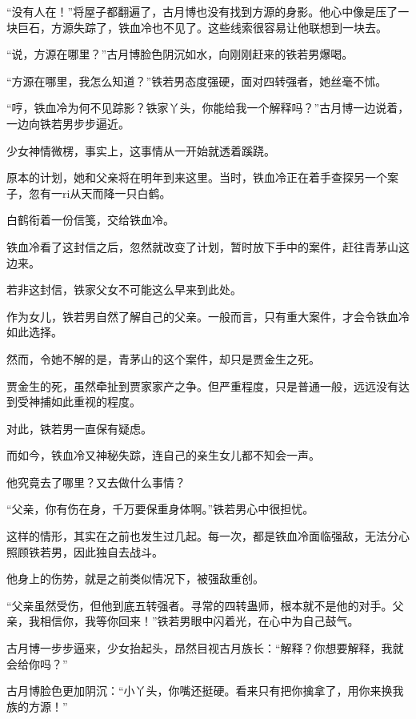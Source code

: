 
\begin{this_body}

“没有人在！”将屋子都翻遍了，古月博也没有找到方源的身影。他心中像是压了一块巨石，方源失踪了，铁血冷也不见了。这些线索很容易让他联想到一块去。

“说，方源在哪里？”古月博脸色阴沉如水，向刚刚赶来的铁若男爆喝。

“方源在哪里，我怎么知道？”铁若男态度强硬，面对四转强者，她丝毫不怵。

“哼，铁血冷为何不见踪影？铁家丫头，你能给我一个解释吗？”古月博一边说着，一边向铁若男步步逼近。

少女神情微楞，事实上，这事情从一开始就透着蹊跷。

原本的计划，她和父亲将在明年到来这里。当时，铁血冷正在着手查探另一个案子，忽有一ri从天而降一只白鹤。

白鹤衔着一份信笺，交给铁血冷。

铁血冷看了这封信之后，忽然就改变了计划，暂时放下手中的案件，赶往青茅山这边来。

若非这封信，铁家父女不可能这么早来到此处。

作为女儿，铁若男自然了解自己的父亲。一般而言，只有重大案件，才会令铁血冷如此选择。

然而，令她不解的是，青茅山的这个案件，却只是贾金生之死。

贾金生的死，虽然牵扯到贾家家产之争。但严重程度，只是普通一般，远远没有达到受神捕如此重视的程度。

对此，铁若男一直保有疑虑。

而如今，铁血冷又神秘失踪，连自己的亲生女儿都不知会一声。

他究竟去了哪里？又去做什么事情？

“父亲，你有伤在身，千万要保重身体啊。”铁若男心中很担忧。

这样的情形，其实在之前也发生过几起。每一次，都是铁血冷面临强敌，无法分心照顾铁若男，因此独自去战斗。

他身上的伤势，就是之前类似情况下，被强敌重创。

“父亲虽然受伤，但他到底五转强者。寻常的四转蛊师，根本就不是他的对手。父亲，我相信你，我等你回来！”铁若男眼中闪着光，在心中为自己鼓气。

古月博一步步逼来，少女抬起头，昂然目视古月族长：“解释？你想要解释，我就会给你吗？”

古月博脸色更加阴沉：“小丫头，你嘴还挺硬。看来只有把你擒拿了，用你来换我族的方源！”


\end{this_body}
